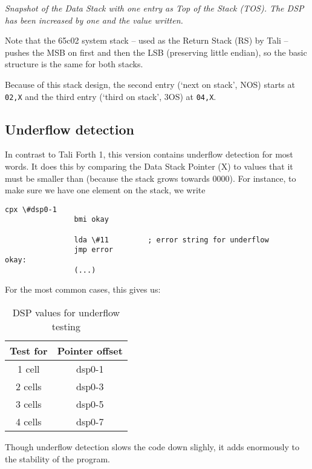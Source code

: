 \textit{Snapshot of the Data Stack with one entry as Top of the Stack (TOS). The
DSP has been increased by one and the value written.}

Note that the 65c02 system stack -- used as the Return Stack (RS) by Tali --
pushes the MSB on first and then the LSB (preserving little endian), so the
basic structure is the same for both stacks. 

Because of this stack design, the second entry (`next on stack', NOS) starts at
\texttt{02,X} and the third entry (`third on stack', 3OS) at \texttt{04,X}. 

\subsection{Underflow detection} In contrast to Tali
Forth 1, this version contains underflow detection for most
words. It does this by comparing the Data Stack Pointer (X) to
values that it must be smaller than (because the stack grows towards 0000). For
instance, to make sure we have one element on the stack, we write

\begin{lstlisting}[frame=single]
                cpx \#dsp0-1
                bmi okay

                lda \#11         ; error string for underflow
                jmp error
okay:
                (...)
\end{lstlisting}

For the most common cases, this gives us:

\begin{table}[h!]
\centering
\begin{tabular}{ | c | c | }
        \hline
        Test for &  Pointer offset\\
        \hline
        1 cell   &  dsp0-1\\
        2 cells  &  dsp0-3\\
        3 cells  &  dsp0-5\\
        4 cells  &  dsp0-7\\
        \hline
\end{tabular}
        \caption{DSP values for underflow testing}
        \label{table_uf}
\end{table}

Though underflow detection slows the code down
slighly, it adds enormously to the stability of the program.

